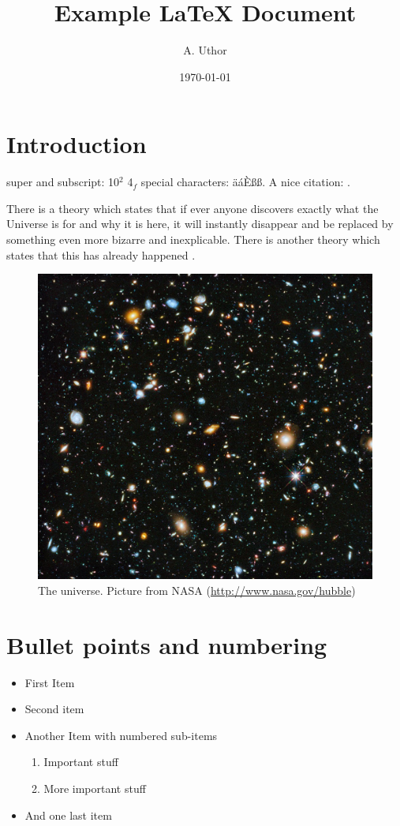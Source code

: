 \documentclass{article}
\title{Example \LaTeX{} Document}
\author{A. Uthor}
\date{\today}
\begin{document}
\maketitle

\newpage


\tableofcontents
\listoffigures
\listoftables

\newpage

\section{Introduction}\label{intro}
super and subscript: 10$^2$ 4$_f$ special characters: äáÈß\ss. A nice citation: \cite{hipsey_2019}.

There is a theory which states that if ever anyone discovers exactly what the Universe is for and why it is here, it will
instantly disappear and be replaced by something even more bizarre and inexplicable.
There is another theory which states that this has already happened  \citep{adams1995hitchhiker}.


\begin{figure}[t]
\centering
\includegraphics[width=0.5\linewidth]{universe.jpg}
\caption[The Universe]{The universe. Picture from NASA (\url{http://www.nasa.gov/hubble})}
\label{fig:galaxy}
\end{figure}

\section{Bullet points and numbering}

\begin{itemize}
    \item First Item
    \item Second item
    \item Another Item with numbered sub-items
    \begin{enumerate}
        \item Important stuff
        \item More important stuff
    \end{enumerate}
    \item And one last item
\end{itemize}
\end{document}
